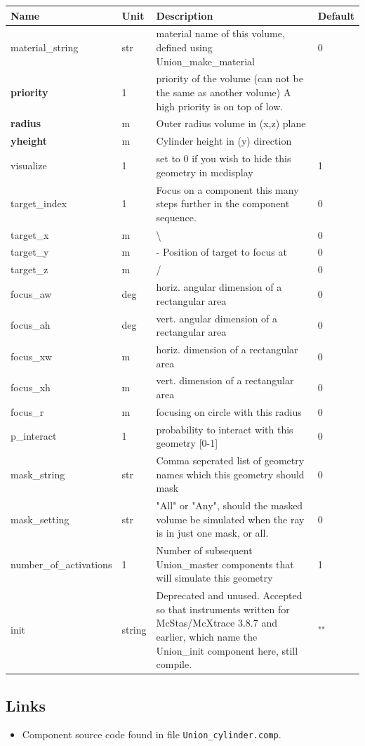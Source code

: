 \begin{longtable}{p{}p{}p{}p{}}
\toprule
\textbf{Name} & \textbf{Unit} & \textbf{Description} & \textbf{Default} \\
\midrule
\endhead
material\_string & str & material name of this volume, defined using Union\_make\_material & 0 \\
\textbf{priority} & 1 & priority of the volume (can not be the same as another volume) A high priority is on top of low. &  \\
\textbf{radius} & m & Outer radius volume in (x,z) plane &  \\
\textbf{yheight} & m & Cylinder height in (y) direction &  \\
visualize & 1 & set to 0 if you wish to hide this geometry in mcdisplay & 1 \\
target\_index & 1 & Focus on a component this many steps further in the component sequence. & 0 \\
target\_x & m & \textbackslash{} & 0 \\
target\_y & m & - Position of target to focus at & 0 \\
target\_z & m & / & 0 \\
focus\_aw & deg & horiz. angular dimension of a rectangular area & 0 \\
focus\_ah & deg & vert. angular dimension of a rectangular area & 0 \\
focus\_xw & m & horiz. dimension of a rectangular area & 0 \\
focus\_xh & m & vert. dimension of a rectangular area & 0 \\
focus\_r & m & focusing on circle with this radius & 0 \\
p\_interact & 1 & probability to interact with this geometry [0-1] & 0 \\
mask\_string & str & Comma seperated list of geometry names which this geometry should mask & 0 \\
mask\_setting & str & "All" or "Any", should the masked volume be simulated when the ray is in just one mask, or all. & 0 \\
number\_of\_activations & 1 & Number of subsequent Union\_master components that will simulate this geometry & 1 \\
init & string & Deprecated and unused. Accepted so that instruments written for McStas/McXtrace 3.8.7 and earlier, which name the Union\_init component here, still compile. & "" \\
\bottomrule
\end{longtable}

\subsection*{Links}
\begin{itemize}
  \item Component source code found in file \texttt{Union\_cylinder.comp}.
\end{itemize}
